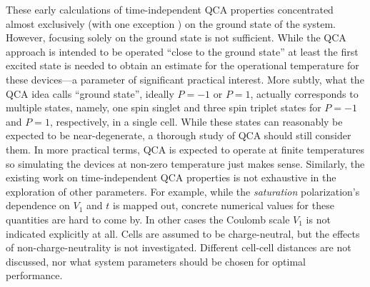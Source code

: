 These early calculations of time-independent QCA properties concentrated almost
exclusively (with one exception \cite{tougaw1993bistable}) on the ground state
of the system. However, focusing solely on the ground state is not sufficient.
While the QCA approach is intended to be operated ``close to the ground state''
at least the first excited state is needed to obtain an estimate for the
operational temperature for these devices---a parameter of significant practical
interest. More subtly, what the QCA idea calls ``ground state'', ideally $P=-1$
or $P=1$, actually corresponds to multiple states, namely, one spin singlet and
three spin triplet states for $P=-1$ and $P=1$, respectively, in a single cell.
While these states can reasonably be expected to be near-degenerate, a thorough
study of QCA should still consider them. In more practical terms, QCA is
expected to operate at finite temperatures so simulating the devices at non-zero
temperature just makes sense. Similarly, the existing work on time-independent
QCA properties is not exhaustive in the exploration of other parameters. For
example, while the \emph{saturation} polarization's dependence on $V_1$ and $t$
is mapped out, concrete numerical values for these quantities are hard to come
by. In other cases the Coulomb scale $V_1$ is not indicated explicitly at all.
Cells are assumed to be charge-neutral, but the effects of non-charge-neutrality
is not investigated.  Different cell-cell distances are not discussed, nor what
system parameters should be chosen for optimal performance.

